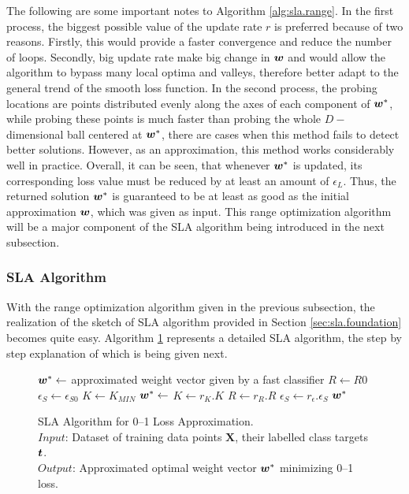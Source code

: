 The following are some important notes to Algorithm
\ref{alg:sla.range}. In the first process, the biggest possible value
of the update rate $r$ is preferred because of two reasons. Firstly,
this would provide a faster convergence and reduce the number of
loops. Secondly, big update rate make big change in $\boldsymbol{w}$ and would
allow the algorithm to bypass many local optima and valleys, therefore
better adapt to the general trend of the smooth loss function. In the
second process, the probing locations are points distributed evenly
along the axes of each component of $\boldsymbol{w}^*$, while probing these points
is much faster than probing the whole $D-$dimensional ball centered at
$\boldsymbol{w}^*$, there are cases when this method fails to detect better
solutions. However, as an approximation, this method works
considerably well in practice. Overall, it can be seen, that whenever
$\boldsymbol{w}^*$ is updated, its corresponding loss value must be reduced by at
least an amount of $\epsilon_L$. Thus, the returned solution $\boldsymbol{w}^*$ is
guaranteed to be at least as good as the initial approximation $\boldsymbol{w}$,
which was given as input. This range optimization algorithm will be a
major component of the SLA algorithm being introduced in the next
subsection.


\subsubsection{SLA Algorithm}
\label{ssec:sla.algorithm} 

With the range optimization algorithm given in the previous
subsection, the realization of the sketch of SLA algorithm provided in
Section \ref{sec:sla.foundation} becomes quite easy. Algorithm
\ref{alg:sla.algorithm} represents a detailed SLA algorithm, the step
by step explanation of which is being given next.

\begin{figure}
\caption{
SLA Algorithm for 0--1 Loss Approximation. \\
\text{\hspace{2.1cm}} $Input$: Dataset of training data points $ \boldsymbol{X}$, their labelled class targets $\boldsymbol{t}$. \\
\text{\hspace{2.1cm}} $Output$: Approximated optimal weight vector $\boldsymbol{w}^*$ minimizing 0--1 loss.
}
\label{alg:sla.algorithm}
\begin{algorithmic}[1]
 
   \State $\boldsymbol{w}^* \gets$ approximated weight vector given by a fast classifier
   \State $R \gets R0$
   \State $\epsilon_S \gets \epsilon_{S0}$
   \State $K \gets K_{MIN}$
      \State $\boldsymbol{w}^* \gets$ 
      \State $K \gets r_K.K$
      \State $R \gets r_R.R$
      \State $\epsilon_S \gets r_\epsilon.\epsilon_S$
   \EndWhile
   \State \Return $\boldsymbol{w}^*$
\EndFunction
\end{algorithmic}
\end{figure}

